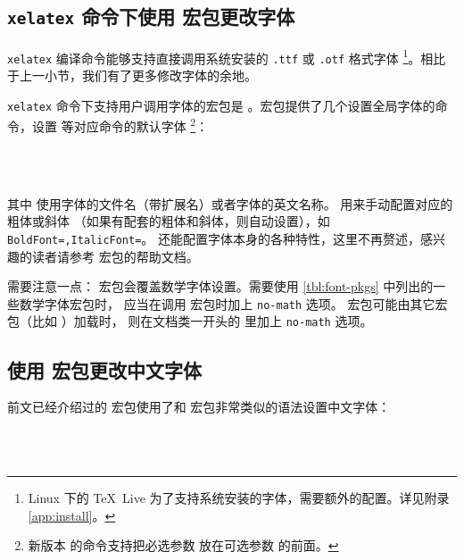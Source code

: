 \subsection{\texttt{xelatex} 命令下使用  宏包更改字体}\label{subsec:fontspec}

\texttt{xelatex} 编译命令能够支持直接调用系统安装的 \texttt{.ttf} 或 \texttt{.otf} 格式字体%
\footnote{Linux 下的 \TeX\ Live 为了支持系统安装的字体，需要额外的配置。详见附录 \ref{app:install}。}。相比于上一小节，我们有了更多修改字体的余地。

\texttt{xelatex} 命令下支持用户调用字体的宏包是 。宏包提供了几个设置全局字体的命令，设置  等对应命令的默认字体%
\footnote{新版本  的命令支持把必选参数  放在可选参数  的前面。}：
\begin{command}
 \\
 \\
\end{command}
其中  使用字体的文件名（带扩展名）或者字体的英文名称。 用来手动配置对应的粗体或斜体
（如果有配套的粗体和斜体，则自动设置），如 \texttt{Bold\-Font=,Italic\-Font=}。
 还能配置字体本身的各种特性，这里不再赘述，感兴趣的读者请参考  宏包的帮助文档。

需要注意一点： 宏包会覆盖数学字体设置。需要使用 \ref{tbl:font-pkgs} 中列出的一些数学字体宏包时，
应当在调用  宏包时加上 \texttt{no-math} 选项。 宏包可能由其它宏包（比如 ）加载时，
则在文档类一开头的  里加上 \texttt{no-math} 选项。

\subsection{使用  宏包更改中文字体}\label{subsec:CJKfont}

前文已经介绍过的  宏包使用了和  宏包非常类似的语法设置中文字体：
\begin{command}
 \\
 \\
\end{command}

